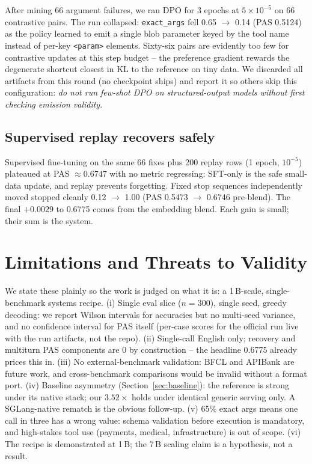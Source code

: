 \documentclass[11pt]{article}
\newcommand{\code}[1]{\texttt{#1}}
\begin{document}
After mining 66 argument failures, we ran DPO for 3 epochs at $5{\times}10^{-5}$
on 66 contrastive pairs. The run collapsed: \code{exact\_args} fell 0.65 $\to$
0.14 (PAS 0.5124) as the policy learned to emit a single blob parameter keyed
by the tool name instead of per-key \code{<param>} elements. Sixty-six pairs are
evidently too few for contrastive updates at this step budget -- the preference
gradient rewards the degenerate shortcut closest in KL to the reference on tiny
data. We discarded all artifacts from this round (no checkpoint ships) and
report it so others skip this configuration: \emph{do not run few-shot DPO on
structured-output models without first checking emission validity}.

\subsection{Supervised replay recovers safely}
\label{sec:replay}

Supervised fine-tuning on the same 66 fixes plus 200 replay rows (1 epoch,
$10^{-5}$) plateaued at PAS $\approx 0.6747$ with no metric regressing: SFT-only
is the safe small-data update, and replay prevents forgetting. Fixed stop
sequences independently moved stopped cleanly 0.12 $\to$ 1.00 (PAS 0.5473 $\to$
0.6746 pre-blend). The final $+0.0029$ to 0.6775 comes from the embedding
blend. Each gain is small; their sum is the system.

\section{Limitations and Threats to Validity}
\label{sec:limits}

We state these plainly so the work is judged on what it is: a 1\,B-scale,
single-benchmark systems recipe.
(i) Single eval slice ($n{=}300$), single seed, greedy decoding: we report
Wilson intervals for accuracies but no multi-seed variance, and no confidence
interval for PAS itself (per-case scores for the official run live with the run
artifacts, not the repo).
(ii) Single-call English only; recovery and multiturn PAS components are 0 by
construction -- the headline 0.6775 already prices this in.
(iii) No external-benchmark validation: BFCL and APIBank are future work, and
cross-benchmark comparisons would be invalid without a format port.
(iv) Baseline asymmetry (Section~\ref{sec:baseline}): the reference is strong
under its native stack; our $3.52\times$ holds under identical generic serving
only. A SGLang-native rematch is the obvious follow-up.
(v) 65\% exact args means one call in three has a wrong value: schema
validation before execution is mandatory, and high-stakes tool use (payments,
medical, infrastructure) is out of scope.
(vi) The recipe is demonstrated at 1\,B; the 7\,B scaling claim is a
hypothesis, not a result.
\end{document}
